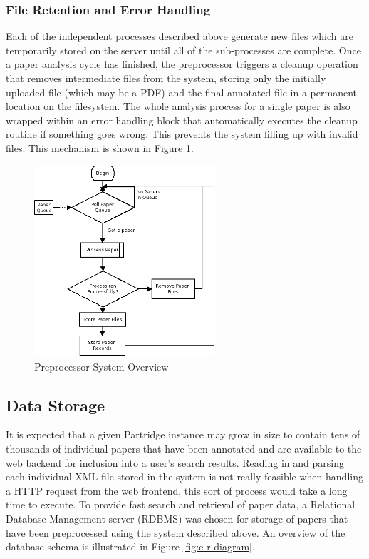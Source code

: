 \subsubsection{File Retention and Error Handling}

Each of the independent processes described above generate new files which are
temporarily stored on the server until all of the sub-processes are complete.
Once a paper analysis cycle has finished, the preprocessor triggers a cleanup
operation that removes intermediate files from the system, storing only the
initially uploaded file (which may be a PDF) and the final annotated file in a
permanent location on the filesystem.  The whole analysis process for a single
paper is also wrapped within an error handling block that automatically
executes the cleanup routine if something goes wrong. This prevents the system
filling up with invalid files. This mechanism is shown in Figure
\ref{fig:preprocessor_overview}.

\begin{figure}[!h]
\vspace{5mm}
\centering
\includegraphics[width=0.6\textwidth]{images/design/paper_processor_overview.png}
\caption{Preprocessor System Overview}
\label{fig:preprocessor_overview}
\end{figure}


\subsection{ Data Storage }
\label{sec:db_layout}
It is expected that a given Partridge instance may grow in size to contain
tens of thousands of individual papers that have been annotated and are available to
the web backend for inclusion into a user's search results. Reading in and
parsing each individual XML file stored in the system is not really feasible
when handling a HTTP request from the web frontend, this sort of process would
take a long time to execute. To provide fast search and retrieval of paper
data, a Relational Database Management server (RDBMS) was chosen for storage of
papers that have been preprocessed using the system described above. An
overview of the database schema is illustrated in Figure \ref{fig:e-r-diagram}.


